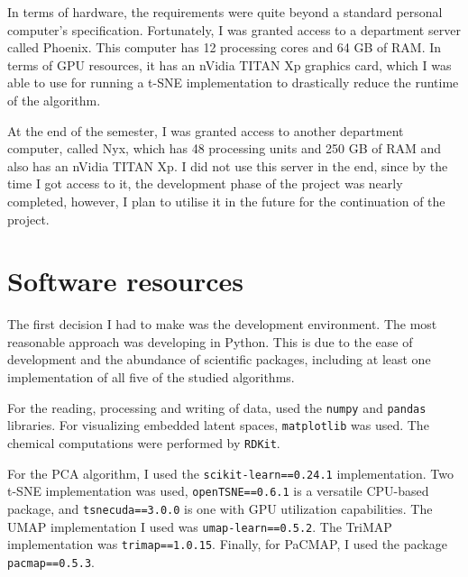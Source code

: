 In terms of hardware, the requirements were quite beyond a standard personal computer's specification. Fortunately, I was granted access to a department server called Phoenix. This computer has 12 processing cores and 64 GB of RAM. In terms of GPU resources, it has an nVidia TITAN Xp graphics card, which I was able to use for running a t-SNE implementation to drastically reduce the runtime of the algorithm.

At the end of the semester, I was granted access to another department computer, called Nyx, which has 48 processing units and 250 GB of RAM and also has an nVidia TITAN Xp. I did not use this server in the end, since by the time I got access to it, the development phase of the project was nearly completed, however, I plan to utilise it in the future for the continuation of the project.

\section{Software resources}\label{sec:software-resources}

The first decision I had to make was the development environment. The most reasonable approach was developing in Python. This is due to the ease of development and the abundance of scientific packages, including at least one implementation of all five of the studied algorithms. 

For the reading, processing and writing of data, used the \texttt{numpy} and \texttt{pandas} libraries. For visualizing embedded latent spaces, \texttt{matplotlib} was used. The chemical computations were performed by \texttt{RDKit}\cite{bib:rdkit}.

For the PCA algorithm, I used the \texttt{scikit-learn==0.24.1} implementation. Two t-SNE implementation was used, \texttt{openTSNE==0.6.1} is a versatile CPU-based package, and \texttt{tsnecuda==3.0.0} is one with GPU utilization capabilities. The UMAP implementation I used was \texttt{umap-learn==0.5.2}. The TriMAP implementation was \texttt{trimap==1.0.15}. Finally, for PaCMAP, I used the package \texttt{pacmap==0.5.3}.